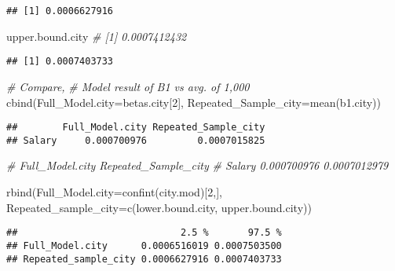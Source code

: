 \documentclass[
]{article}
\newenvironment{Shaded}{\begin{snugshade}}{\end{snugshade}}
\newcommand{\AttributeTok}[1]{\textcolor[rgb]{0.77,0.63,0.00}{#1}}
\newcommand{\CommentTok}[1]{\textcolor[rgb]{0.56,0.35,0.01}{\textit{#1}}}
\newcommand{\DecValTok}[1]{\textcolor[rgb]{0.00,0.00,0.81}{#1}}
\newcommand{\FunctionTok}[1]{\textcolor[rgb]{0.00,0.00,0.00}{#1}}
\newcommand{\NormalTok}[1]{#1}
\begin{document}
\begin{verbatim}
## [1] 0.0006627916
\end{verbatim}

\begin{Shaded}
\begin{Highlighting}[]
\NormalTok{upper.bound.city     }\CommentTok{\# [1] 0.0007412432}
\end{Highlighting}
\end{Shaded}

\begin{verbatim}
## [1] 0.0007403733
\end{verbatim}

\begin{Shaded}
\begin{Highlighting}[]
\CommentTok{\# Compare,}
\CommentTok{\# Model result of B1 vs avg. of 1,000 }
\FunctionTok{cbind}\NormalTok{(}\AttributeTok{Full\_Model.city=}\NormalTok{betas.city[}\DecValTok{2}\NormalTok{], }\AttributeTok{Repeated\_Sample\_city=}\FunctionTok{mean}\NormalTok{(b1.city))  }
\end{Highlighting}
\end{Shaded}

\begin{verbatim}
##        Full_Model.city Repeated_Sample_city
## Salary     0.000700976         0.0007015825
\end{verbatim}

\begin{Shaded}
\begin{Highlighting}[]
    \CommentTok{\#             Full\_Model.city     Repeated\_Sample\_city}
    \CommentTok{\# Salary       0.000700976         0.0007012979}


\FunctionTok{rbind}\NormalTok{(}\AttributeTok{Full\_Model.city=}\FunctionTok{confint}\NormalTok{(city.mod)[}\DecValTok{2}\NormalTok{,], }\AttributeTok{Repeated\_sample\_city=}\FunctionTok{c}\NormalTok{(lower.bound.city, upper.bound.city))}
\end{Highlighting}
\end{Shaded}

\begin{verbatim}
##                             2.5 %       97.5 %
## Full_Model.city      0.0006516019 0.0007503500
## Repeated_sample_city 0.0006627916 0.0007403733
\end{verbatim}
\end{document}
